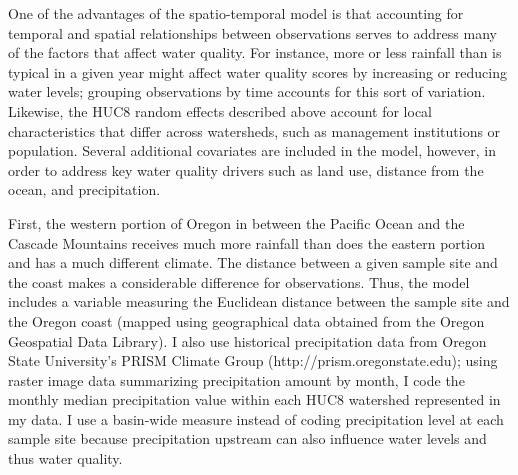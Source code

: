 \documentclass[12pt,a4paper,titlepage]{article}
\begin{document}
One of the advantages of the spatio-temporal model is that accounting for temporal and spatial relationships between observations serves to address many of the factors that affect water quality. For instance, more or less rainfall than is typical in a given year might affect water quality scores by increasing or reducing water levels; grouping observations by time accounts for this sort of variation. Likewise, the HUC8 random effects described above account for local characteristics that differ across watersheds, such as management institutions or population. Several additional covariates are included in the model, however, in order to address key water quality drivers such as land use, distance from the ocean, and precipitation.

First, the western portion of Oregon in between the Pacific Ocean and the Cascade Mountains receives much more rainfall than does the eastern portion and has a much different climate. The distance between a given sample site and the coast makes a considerable difference for observations. Thus, the model includes a variable measuring the Euclidean distance between the sample site and the Oregon coast (mapped using geographical data obtained from the Oregon Geospatial Data Library). I also use historical precipitation data from Oregon State University’s PRISM Climate Group (http://prism.oregonstate.edu); using raster image data summarizing precipitation amount by month, I code the monthly median precipitation value within each HUC8 watershed represented in my data. I use a basin-wide measure instead of coding precipitation level at each sample site because precipitation upstream can also influence water levels and thus water quality. 
\end{document}
